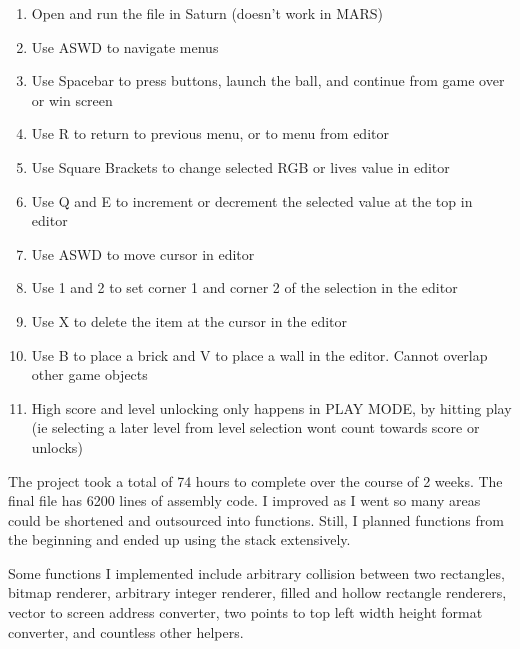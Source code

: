 \documentclass{article}
\begin{document}
\begin{enumerate}
    \begin{enumerate}

    \item Open and run the file in Saturn (doesn't work in MARS)
    \item Use ASWD to navigate menus
    \item Use Spacebar to press buttons, launch the ball, and continue from game over or win screen
    \item Use R to return to previous menu, or to menu from editor
    \item Use Square Brackets to change selected RGB or lives value in editor
    \item Use Q and E to increment or decrement the selected value at the top in editor
    \item Use ASWD to move cursor in editor
    \item Use 1 and 2 to set corner 1 and corner 2 of the selection in the editor
    \item Use X to delete the item at the cursor in the editor
    \item Use B to place a brick and V to place a wall in the editor. Cannot overlap other game objects
    \item High score and level unlocking only happens in PLAY MODE, by hitting play (ie selecting a later level from level selection wont count towards score or unlocks)


    \end{enumerate}

    
\end{enumerate}


The project took a total of 74 hours to complete over the course of 2 weeks. The final file has 6200 lines of assembly code. I improved as I went so many areas could be shortened and outsourced into functions. Still, I planned functions from the beginning and ended up using the stack extensively. 

Some functions I implemented include arbitrary collision between two rectangles, bitmap renderer, arbitrary integer renderer, filled and hollow rectangle renderers, vector to screen address converter, two points to top left width height format converter, and countless other helpers. 
\end{document}
